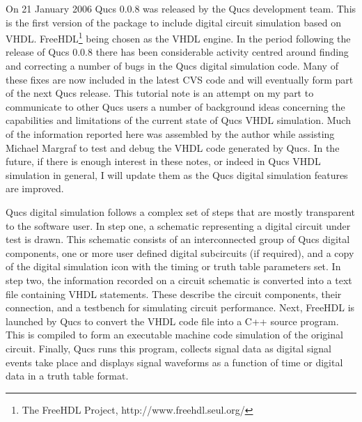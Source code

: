 %
%
%
%


On 21 January 2006 Qucs 0.0.8 was released by the Qucs development
team.  This is the first version of the package to include digital
circuit simulation based on VHDL.  FreeHDL\footnote{The FreeHDL
Project, http://www.freehdl.seul.org/} being chosen as the VHDL
engine.  In the period following the release of Qucs 0.0.8 there has
been considerable activity centred around finding and correcting a
number of bugs in the Qucs digital simulation code.  Many of these
fixes are now included in the latest CVS code and will eventually form
part of the next Qucs release.  This tutorial note is an attempt on my
part to communicate to other Qucs users a number of background ideas
concerning the capabilities and limitations of the current state of
Qucs VHDL simulation.  Much of the information reported here was
assembled by the author while assisting Michael Margraf to test and
debug the VHDL code generated by Qucs.  In the future, if there is
enough interest in these notes, or indeed in Qucs VHDL simulation in
general, I will update them as the Qucs digital simulation features
are improved.

\addvspace{12pt}

Qucs digital simulation follows a complex set of steps that are mostly
transparent to the software user.  In step one, a schematic
representing a digital circuit under test is drawn.  This schematic
consists of an interconnected group of Qucs digital components, one or
more user defined digital subcircuits (if required), and a copy of the
digital simulation icon with the timing or truth table parameters set.
In step two, the information recorded on a circuit schematic is
converted into a text file containing VHDL statements. These describe
the circuit components, their connection, and a testbench for
simulating circuit performance.  Next, FreeHDL is launched by Qucs to
convert the VHDL code file into a C++ source program.  This is
compiled to form an executable machine code simulation of the original
circuit.  Finally, Qucs runs this program, collects signal data as
digital signal events take place and displays signal waveforms as a
function of time or digital data in a truth table format.

